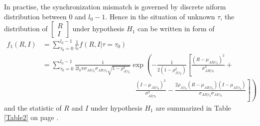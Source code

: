 In practise, the synchronization mismatch is governed by discrete niform distribution between $0$ and $l_0-1$. Hence in the situation of unknown $\tau$, the distribution of  
$\begin{bmatrix}
  R \\
  I
\end{bmatrix}$
under hypothesis $H_1$ can be written in form of 
\begin{equation}
  \begin{split}
	f_1(R, I) &= \sum_{\tau_0 = 0}^{l_0-1} \frac{1}{l_0}f(R, I|\tau=\tau_0)\\
	&= \sum_{\tau_0 = 0}^{l_0-1}\frac{1}{2l_0\pi\sigma_{AI|\tau_0}\sigma_{AR|\tau_0}\sqrt{1 - \rho_{A|\tau_0}^2}}\exp\left( -\frac{1}{2(1-\rho_{A|\tau_0}^2)}\left[ \frac{(R-\mu_{AR|\tau_0})^2}{\sigma_{AR|\tau_0}^2} + \right.\right.\\
	& \left. \left. \;\;\;\;\;\;\;\;\;\;\;\;\;\;\;\; \;\;\;\;\;\;\;\;\;\;\;\;\;\;\;\; \;\;\;\;\;\;\;\;\;\;\;\;\;\;\;\; \frac{(I-\mu_{AI|\tau_0})^2}{\sigma_{AI|\tau_0}^2} - \frac{2\rho_{A|\tau_0}(R-\mu_{AR|\tau_0})(I-\mu_{AI|\tau_0})}{\sigma_{AR|\tau_0}\sigma_{AI|\tau_0}}\right] \right)
  \end{split}
  \label{f_1underH1}
\end{equation}
and the statistic of $R$ and $I$  under hypothesis $H_1$ are summarized in Table \ref{Table2} on page \pageref{Table2}.

